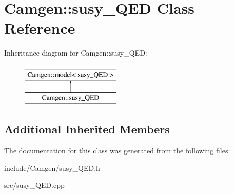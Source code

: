\hypertarget{a00530}{}\section{Camgen\+:\+:susy\+\_\+\+Q\+E\+D Class Reference}
\label{a00530}
Inheritance diagram for Camgen\+:\+:susy\+\_\+\+Q\+E\+D\+:\begin{figure}[H]
\begin{center}
\leavevmode
\includegraphics[height=2.000000cm]{a00530}
\end{center}
\end{figure}
\subsection*{Additional Inherited Members}


The documentation for this class was generated from the following files\+:\begin{DoxyCompactItemize}
\item 
include/\+Camgen/susy\+\_\+\+Q\+E\+D.\+h\item 
src/susy\+\_\+\+Q\+E\+D.\+cpp\end{DoxyCompactItemize}
